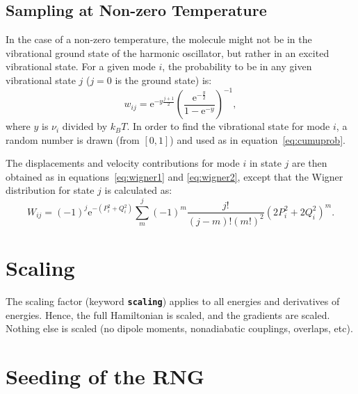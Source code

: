 \documentclass[a4paper,10pt,DIV=15,openany]{scrbook}
\newcommand{\todo}[1]{\textcolor{RL}{#1}}
\newcommand{\ttt}[1]{\textbf{\texttt{#1}}}
\newcommand{\E}{\ensuremath{\mathrm{e}}}
\begin{document}
\subsection{Sampling at Non-zero Temperature}


In the case of a non-zero temperature, the molecule might not be in the vibrational ground state of the harmonic oscillator, but rather in an excited vibrational state.
For a given mode $i$, the probability to be in any given vibrational state $j$ ($j=0$ is the ground state) is:
\begin{equation}
  w_{ij}=\E^{-y\frac{j+1}{2}}\left(\frac{\E^{-\frac{y}{2}}}{1-\E^{-y}}\right)^{-1},
\end{equation}
where $y$ is $\nu_i$ divided by $k_BT$.
In order to find the vibrational state for mode $i$, a random number is drawn (from $[0,1]$) and used as in equation~\eqref{eq:cumuprob}.

The displacements and velocity contributions for mode $i$ in state $j$ are then obtained as in equations~\eqref{eq:wigner1} and \eqref{eq:wigner2}, except that the Wigner distribution for state $j$ is calculated as:
\begin{equation}
  W_{ij}
  =
  (-1)^j
  \E^{-(P_i^2+Q_i^2)}
  \sum_m^j
  (-1)^m
  \frac{j!}{(j-m)!(m!)^2}
  \left(2P_i^2+2Q_i^2\right)^m.
\end{equation}





\section{Scaling}\label{met:scaling}

The scaling factor (keyword \ttt{scaling}) applies to all energies and derivatives of energies. Hence, the full Hamiltonian is scaled, and the gradients are scaled. Nothing else is scaled (no dipole moments, nonadiabatic couplings, overlaps, etc).


\section{Seeding of the RNG}\label{met:seed}
\end{document}
